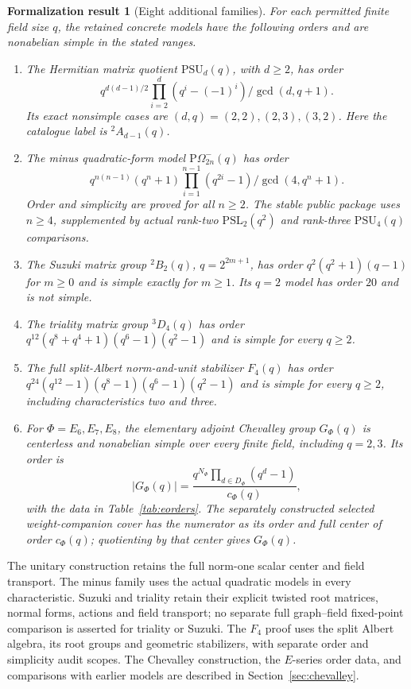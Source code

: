 \documentclass[11pt]{article}
\numberwithin{equation}{section}
\newtheorem{formalization}[theorem]{Formalization result}
\theoremstyle{definition}
\newcommand{\PSL}{\mathrm{PSL}}
\newcommand{\PSU}{\mathrm{PSU}}
\newcommand{\POm}{\mathrm{P}\Omega}
\begin{document}
\begin{formalization}[Eight additional families]\label{thm:additions}
For each permitted finite field size $q$, the retained concrete models have the
following orders and are nonabelian simple in the stated ranges.
\begin{enumerate}
\item The Hermitian matrix quotient $\PSU_d(q)$, with $d\geq2$, has order
\[
 q^{d(d-1)/2}\prod_{i=2}^{d}(q^i-(-1)^i)/\gcd(d,q+1).
\]
Its exact nonsimple cases are $(d,q)=(2,2),(2,3),(3,2)$.
Here the catalogue label is $ {}^2A_{d-1}(q)$.
\item The minus quadratic-form model $\POm^-_{2n}(q)$ has order
\[
 q^{n(n-1)}(q^n+1)\prod_{i=1}^{n-1}(q^{2i}-1)/\gcd(4,q^n+1).
\]
Order and simplicity are proved for all $n\geq2$. The stable public package
uses $n\geq4$, supplemented by actual rank-two $\PSL_2(q^2)$ and
rank-three $\PSU_4(q)$ comparisons.
\item The Suzuki matrix group $ {}^2B_2(q)$, $q=2^{2m+1}$, has order
$q^2(q^2+1)(q-1)$ for $m\geq0$ and is simple exactly for $m\geq1$.
Its $q=2$ model has order $20$ and is not simple.
\item The triality matrix group $ {}^3D_4(q)$ has order
$q^{12}(q^8+q^4+1)(q^6-1)(q^2-1)$ and is simple for every $q\geq2$.
\item The full split-Albert norm-and-unit stabilizer $F_4(q)$ has order
$q^{24}(q^{12}-1)(q^8-1)(q^6-1)(q^2-1)$ and is simple for every $q\geq2$,
including characteristics two and three.
\item For $\Phi=E_6,E_7,E_8$, the elementary adjoint Chevalley group
$G_\Phi(q)$ is centerless and nonabelian simple over every finite field,
including $q=2,3$. Its order is
\[
 |G_\Phi(q)|=\frac{q^{N_\Phi}\prod_{d\in D_\Phi}(q^d-1)}{c_\Phi(q)},
\]
with the data in Table~\ref{tab:eorders}. The separately constructed
selected weight-companion cover has the numerator as its order and full
center of order $c_\Phi(q)$; quotienting by that center gives $G_\Phi(q)$.
\end{enumerate}
\end{formalization}
The unitary construction retains the full norm-one scalar center and field
transport. The minus family uses the actual quadratic models in every
characteristic. Suzuki and triality retain their explicit twisted root matrices,
normal forms, actions and field transport; no separate full graph--field
fixed-point comparison is asserted for triality or Suzuki. The $F_4$ proof
uses the split Albert algebra, its root groups and geometric stabilizers,
with separate order and simplicity audit scopes. The Chevalley construction,
the $E$-series order data, and comparisons with earlier models are described
in Section~\ref{sec:chevalley}.
\end{document}
